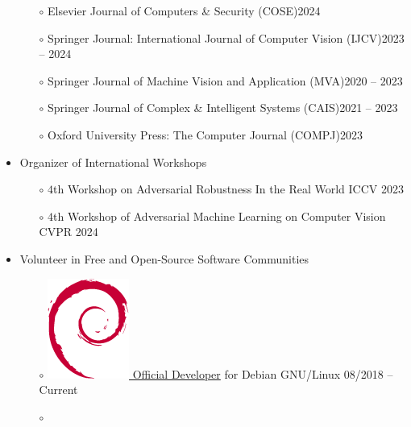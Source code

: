 \documentclass[10pt,margin,line,pifont,palatino,courier]{res}
\begin{document}
\begin{resume}
\begin{itemize}[leftmargin=*]
\begin{itemize}[noitemsep, leftmargin=*]
        \item[$\circ$] Elsevier Journal of Computers \& Security (COSE)\hfill 2024
        \item[$\circ$] Springer Journal: International Journal of Computer Vision (IJCV)\hfill 2023 -- 2024
		\item[$\circ$] Springer Journal of Machine Vision and Application (MVA)\hfill 2020 -- 2023
		\item[$\circ$] Springer Journal of Complex \& Intelligent Systems (CAIS)\hfill 2021 -- 2023
        \item[$\circ$] Oxford University Press: The Computer Journal (COMPJ)\hfill 2023
	\end{itemize}
\item Organizer of International Workshops
    \begin{itemize}[noitemsep, leftmargin=*]
        \item[$\circ$] $4$th Workshop on Adversarial Robustness In the Real World \hfill ICCV  2023
\reversemarginpar{}
        \item[$\circ$] $4$th Workshop of Adversarial Machine Learning on Computer Vision \hfill CVPR 2024
\reversemarginpar{}
    \end{itemize}
\item Volunteer in Free and Open-Source Software Communities
    \begin{itemize}[noitemsep, leftmargin=*]
        \item[$\circ$] \href{https://nm.debian.org/person/lumin/}{
            \includegraphics[height=1.2\fontcharht\font`\B]{openlogo-nd-100.png}
            Official Developer} for Debian GNU/Linux
            \hfill 08/2018 -- Current
        \item[$\circ$] \href{https://wiki.gentoo.org/wiki/Blas-lapack-switch}{
}
\end{itemize}
\end{itemize}
\end{resume}
\end{document}
